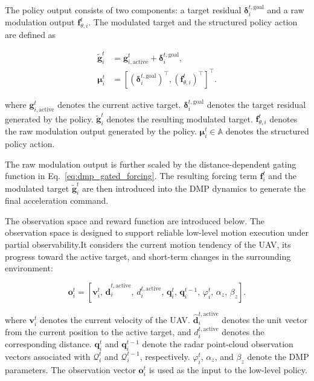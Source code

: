 The policy output consists of two components: a target residual $\boldsymbol\delta_i^{t,\mathrm{goal}}$ and a raw modulation output $\mathbf{f}_{\theta,i}^t$. 
The modulated target and the structured policy action are defined as

\begin{equation}
    \label{eq:dmp_structured_action_and_goal}
    \begin{aligned}
        \widetilde{\mathbf g}_i^t
        &=
        \mathbf g_{i,\mathrm{active}}^t
        +
        \boldsymbol\delta_i^{t,\mathrm{goal}},\\
        \boldsymbol\mu_i^t
        &=
        \left[
        (\boldsymbol\delta_i^{t,\mathrm{goal}})^\top,
        (\mathbf f_{\theta,i}^t)^\top
        \right]^\top .
    \end{aligned}
\end{equation}

\noindent
where $\mathbf g_{i,\mathrm{active}}^t$ denotes the current active target. 
$\boldsymbol\delta_i^{t,\mathrm{goal}}$ denotes the target residual generated by the policy. $\widetilde{\mathbf g}_i^t$ denotes the resulting modulated target. $\mathbf f_{\theta,i}^t$ denotes the raw modulation output generated by the policy. $\boldsymbol\mu_i^t\in\mathbb A$ denotes the structured policy action.

The raw modulation output is further scaled by the distance-dependent gating function in Eq.~\eqref{eq:dmp_gated_forcing}. The resulting forcing term $\mathbf f_i^t$ and the modulated target $\widetilde{\mathbf g}_i^t$ are then introduced into the DMP dynamics to generate the final acceleration command.

The observation space and reward function are introduced below. 
The observation space is designed to support reliable low-level motion execution under partial observability.It considers the current motion tendency of the UAV, its progress toward the active target, and short-term changes in the surrounding environment:

\begin{equation}
    \label{eq:observation_space}
    \mathbf{o}_i^t
    =
    \left[
    \mathbf{v}_i^t,\,
    \hat{\mathbf{d}}_i^{t,\mathrm{active}},\,
    d_i^{t,\mathrm{active}},\,
    \mathbf q_i^t,\,
    \mathbf q_i^{t-1},\,
    \varphi_i^t,\,
    \alpha_z,\,
    \beta_z
    \right].
\end{equation}

\noindent
where $\mathbf{v}_i^t$ denotes the current velocity of the UAV. $\hat{\mathbf{d}}_i^{t,\mathrm{active}}$ denotes the unit vector from the current position to the active target, and $d_i^{t,\mathrm{active}}$ denotes the corresponding distance. $\mathbf q_i^t$ and $\mathbf q_i^{t-1}$ denote the radar point-cloud observation vectors associated with $\mathcal Q_i^t$ and $\mathcal Q_i^{t-1}$, respectively. $\varphi_i^t$, $\alpha_z$, and $\beta_z$ denote the DMP parameters. The observation vector $\mathbf{o}_i^t$ is used as the input to the low-level policy.

